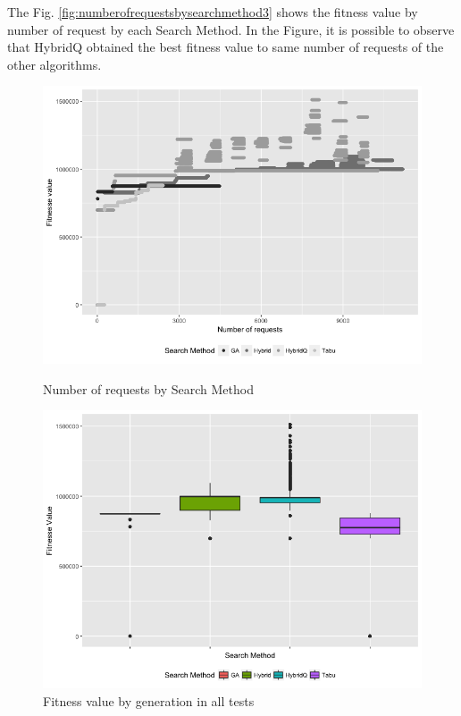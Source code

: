 The Fig. \ref{fig:numberofrequestsbysearchmethod3} shows the fitness value by number of request by each Search Method. In the Figure, it is possible to observe that HybridQ obtained the best fitness value to same number of requests of the other algorithms.

\begin{figure}[h]
\begin{minipage}{.5\textwidth}
\centering
\includegraphics[width=1\textwidth]{./images/experiment3-3.png}
\caption{Number of requests by Search Method}
\label{fig:numberofrequestsbysearchmethod3}
\end{minipage}
\begin{minipage}{.5\textwidth}
\centering
\includegraphics[width=1\textwidth]{./images/experiment3-4.png}
\caption{Fitness value by generation in all tests}
\label{fig:boxplot3}
\end{minipage}

\end{figure}

